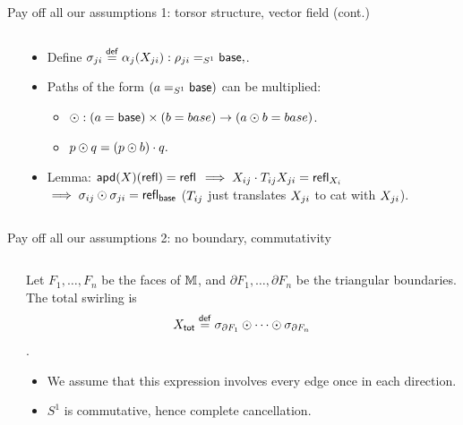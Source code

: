 \begin{frame}{Pay off all our assumptions 1: torsor structure, vector field (cont.)}
\begin{columns}
\begin{column}{0.15\textwidth}

\end{column}
\begin{column}{0.85\textwidth}
\begin{itemize}
\item<2-> Define \( \sigma_{ji}\stackrel{\mathsf{def}}{=} \alpha_j(X_{ji}):\rho_{ji}=_{S^1}\mathsf{base}, \).
\item<3-> Paths of the form \( (a=_{S^1}\mathsf{base}) \) can be multiplied: 
\begin{itemize}
\item \( \odot:(a=\mathsf{base})\times (b=base)\to (a\odot b=base) \).
\item \( p\odot q=(p\odot b)\cdot q. \)
\end{itemize}
\item<4-> Lemma: \( \mathsf{apd}(X)(\mathsf{refl})=\mathsf{refl}\) \(\implies X_{ij}\cdot T_{ij}X_{ji}=\mathsf{refl}_{X_i}\) \(\implies\sigma_{ij}\odot\sigma_{ji}=\mathsf{refl}_{\mathsf{base}} \) (\( T_{ij} \) just translates \( X_{ji} \) to cat with \( X_{ji} \)).
\end{itemize}
\end{column}
\end{columns}
\end{frame}

\begin{frame}{Pay off all our assumptions 2: no boundary, commutativity}
\begin{columns}
\begin{column}{0.15\textwidth}

\end{column}
\begin{column}{0.85\textwidth}
\begin{mydef}
Let \( F_1,\ldots,F_n \) be the faces of \( \mathbb{M} \), and \( \partial F_1,\ldots,\partial F_n \) be the triangular boundaries. The \alert{total swirling} is \[ X_{\mathsf{tot}} \stackrel{\mathsf{def}}{=} \sigma_{\partial F_1}\odot\cdots\odot\sigma_{\partial F_n} \].
\end{mydef}
\begin{itemize}
\item<2-> We assume that this expression involves \alert{every edge once in each direction}.
\item<3-> \( S^1 \) is commutative, hence \alert{complete cancellation}.
\end{itemize}
\end{column}
\end{columns}
\end{frame}


